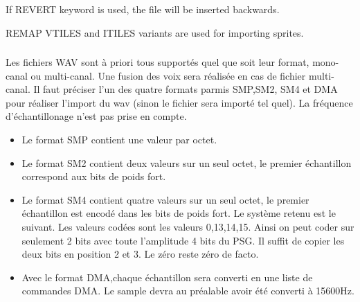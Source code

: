 \begin{xen}
If REVERT keyword is used, the file will be inserted backwards.

REMAP VTILES and ITILES variants are used for importing sprites.
\end{xen}



\subsubsection{}

\begin{xfr}
Les fichiers WAV sont à priori tous supportés quel que soit leur format, mono-canal ou multi-canal. Une fusion des voix sera réalisée en cas de fichier multi-canal. Il faut préciser l'un des quatre formats parmis SMP,SM2, SM4 et DMA pour réaliser l'import du wav (sinon le fichier sera importé tel quel). La fréquence d'échantillonage n'est pas prise en compte.

\begin{itemize}
\item Le format SMP contient une valeur par octet.
\item Le format SM2 contient deux valeurs sur un seul octet, le premier échantillon correspond aux bits de poids fort.
\item Le format SM4 contient quatre valeurs sur un seul octet, le premier échantillon est encodé dans les bits de poids fort. Le système retenu est le suivant. Les valeurs codées sont les valeurs 0,13,14,15. Ainsi on peut coder sur seulement 2 bits avec toute l'amplitude 4 bits du PSG. Il suffit de copier les deux bits en position 2 et 3. Le zéro reste zéro de facto.
\item Avec le format DMA,chaque échantillon sera converti en une liste de commandes DMA. Le sample devra au préalable avoir été converti à 15600Hz.
\end{itemize}
\end{xfr}


